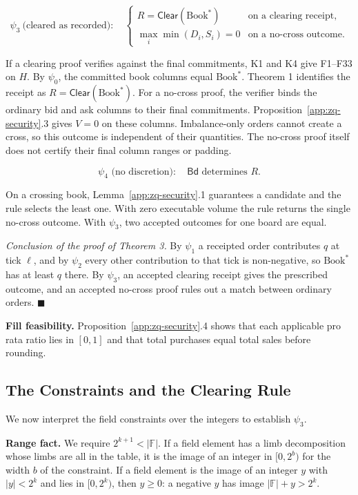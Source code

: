 \[
\psi_3\ \text{(cleared as recorded)}:\quad
\begin{cases}
 R=\mathsf{Clear}(\text{Book}^*) & \text{on a clearing receipt},\\
 \max_i\min(D_i,S_i)=0 & \text{on a no-cross outcome}.
\end{cases}
\]

If a clearing proof verifies against the final commitments, K1 and K4 give F1--F33 on \(H\). By \(\psi_0\), the committed book columns equal \(\text{Book}^*\). Theorem 1 identifies the receipt as \(R=\mathsf{Clear}(\text{Book}^*)\). For a no-cross proof, the verifier binds the ordinary bid and ask columns to their final commitments. Proposition~\ref{app:zq-security}.3 gives \(V=0\) on these columns. Imbalance-only orders cannot create a cross, so this outcome is independent of their quantities. The no-cross proof itself does not certify their final column ranges or padding.

\[\psi_4 \text{ (no discretion)}:\quad \mathsf{Bd} \text{ determines } R.\]

On a crossing book, Lemma~\ref{app:zq-security}.1 guarantees a candidate and the rule selects the least one. With zero executable volume the rule returns the single no-cross outcome. With \(\psi_3\), two accepted outcomes for one board are equal.

\emph{Conclusion of the proof of Theorem 3.} By \(\psi_1\) a receipted order contributes \(q\) at tick \(\ell\), and by \(\psi_2\) every other contribution to that tick is non-negative, so \(\text{Book}^*\) has at least \(q\) there. By \(\psi_3\), an accepted clearing receipt gives the prescribed outcome, and an accepted no-cross proof rules out a match between ordinary orders. \(\blacksquare\)

\textbf{Fill feasibility.} Proposition~\ref{app:zq-security}.4 shows that each applicable pro rata ratio lies in \([0,1]\) and that total purchases equal total sales before rounding.

\subsection{The Constraints and the Clearing Rule}
\label{app:zq-constraint-proof}

We now interpret the field constraints over the integers to establish \(\psi_3\).

\textbf{Range fact.} We require \(2^{k+1} < |\mathbb{F}|\). If a field element has a limb decomposition whose limbs are all in the table, it is the image of an integer in \([0, 2^b)\) for the width \(b\) of the constraint. If a field element is the image of an integer \(y\) with \(|y| < 2^k\) and lies in \([0, 2^k)\), then \(y \ge 0\): a negative \(y\) has image \(|\mathbb{F}| + y > 2^k\).

